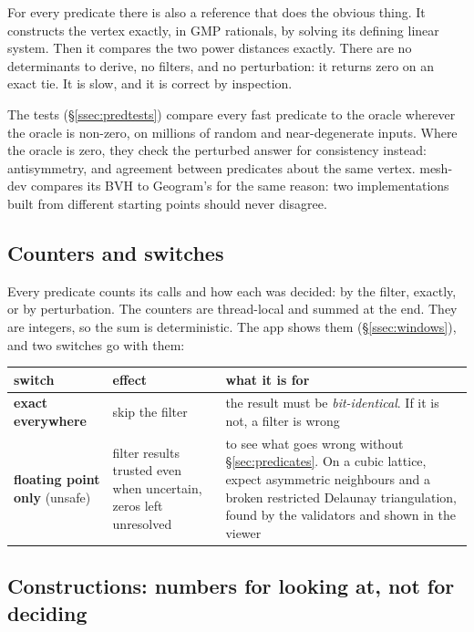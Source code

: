 \documentclass[11pt,a4paper]{article}
\newcommand{\secref}[1]{\S\ref{#1}}
\begin{document}
For every predicate there is also a reference that does the obvious thing. It constructs the
vertex exactly, in GMP rationals, by solving its defining linear system. Then it compares the
two power distances exactly. There are no determinants to derive, no filters, and no
perturbation: it returns zero on an exact tie. It is slow, and it is correct by inspection.

The tests (\secref{ssec:predtests}) compare every fast predicate to the oracle wherever the
oracle is non-zero, on millions of random and near-degenerate inputs. Where the oracle is zero,
they check the perturbed answer for consistency instead: antisymmetry, and agreement between
predicates about the same vertex. mesh-dev compares its BVH to Geogram's for the same reason:
two implementations built from different starting points should never disagree.

\subsection{Counters and switches}\label{ssec:counters}

Every predicate counts its calls and how each was decided: by the filter, exactly, or by
perturbation. The counters are thread-local and summed at the end. They are integers, so the sum
is deterministic. The app shows them (\secref{ssec:windows}), and two switches go with them:

{\small
\begin{xltabular}{\linewidth}{@{}P{3.1cm} P{4.2cm} L@{}}
\toprule
switch & effect & what it is for \\
\midrule
\endhead
\textbf{exact everywhere} & skip the filter
  & the result must be \emph{bit-identical}. If it is not, a filter is wrong \\
\textbf{floating point only} (unsafe) & filter results trusted even when uncertain, zeros left
  unresolved
  & to see what goes wrong without \secref{sec:predicates}. On a cubic lattice, expect
    asymmetric neighbours and a broken restricted Delaunay triangulation, found by the
    validators and shown in the viewer \\
\bottomrule
\end{xltabular}}

\subsection{Constructions: numbers for looking at, not for deciding}\label{ssec:constructions}
\end{document}
